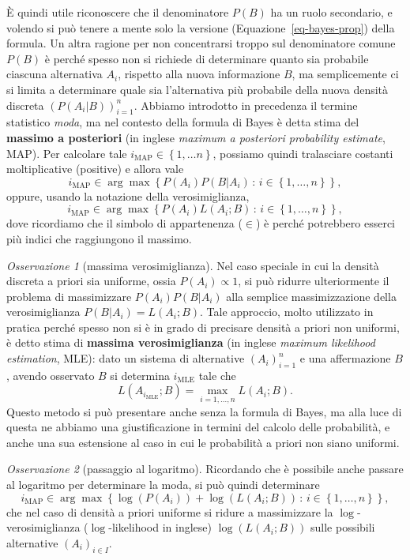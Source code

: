 \documentclass[
  italian,
  letterpaper,
]{book}
\newcommand{\cur}[1]{\left\{ #1 \right\}}
\newcommand{\map}{\operatorname{MAP}}
\newcommand{\mle}{\operatorname{MLE}}
\theoremstyle{definition}
\theoremstyle{remark}
\newtheorem*{remark}{Osservazione}
\begin{document}
È quindi utile riconoscere che il denominatore \(P(B)\) ha un ruolo
secondario, e volendo si può tenere a mente solo la versione
(Equazione~\ref{eq-bayes-prop}) della formula. Un altra ragione per non
concentrarsi troppo sul denominatore comune \(P(B)\) è perché spesso non
si richiede di determinare quanto sia probabile ciascuna alternativa
\(A_i\), rispetto alla nuova informazione \(B\), ma semplicemente ci si
limita a determinare quale sia l'alternativa più probabile della nuova
densità discreta \((P(A_i|B))_{i=1}^n\). Abbiamo introdotto in
precedenza il termine statistico \emph{moda}, ma nel contesto della
formula di Bayes è detta stima del \textbf{massimo a posteriori} (in
inglese \emph{maximum a posteriori probability estimate}, MAP). Per
calcolare tale \(i_{\map} \in \cur{1, \ldots n}\), possiamo quindi
tralasciare costanti moltiplicative (positive) e allora vale
\[ i_{\map} \in \operatorname{arg} \max\cur{ P(A_i)  P(B | A_i )\, : \, i \in \cur{1, \ldots, n} }, \]
oppure, usando la notazione della verosimiglianza,
\[ i_{\map} \in \operatorname{arg} \max\cur{ P(A_i)  L( A_i ;B )\, : \, i \in \cur{1, \ldots, n} }, \]
dove ricordiamo che il simbolo di appartenenza (\(\in\)) è perché
potrebbero esserci più indici che raggiungono il massimo.

\begin{remark}[massima verosimiglianza]
Nel caso speciale in cui la densità discreta a priori sia uniforme,
ossia \(P(A_i) \propto 1\), si può ridurre ulteriormente il problema di
massimizzare \(P(A_i) P(B | A_i )\) alla semplice massimizzazione della
verosimiglianza \(P(B| A_i)=L(A_i;B)\). Tale approccio, molto utilizzato
in pratica perché spesso non si è in grado di precisare densità a priori
non uniformi, è detto stima di \textbf{massima verosimiglianza} (in
inglese \emph{maximum likelihood estimation}, MLE): dato un sistema di
alternative \((A_i)_{i=1}^n\) e una affermazione \(B\), avendo osservato
\(B\) si determina \(i_{\mle}\) tale che
\[ L(A_{i_{\mle}}; B)  = \max_{i=1, \ldots, n}L(A_i; B).\] Questo metodo
si può presentare anche senza la formula di Bayes, ma alla luce di
questa ne abbiamo una giustificazione in termini del calcolo delle
probabilità, e anche una sua estensione al caso in cui le probabilità a
priori non siano uniformi.
\end{remark}

\begin{remark}[passaggio al logaritmo]
Ricordando che è possibile anche passare al logaritmo per determinare la
moda, si può quindi determinare
\[  i_{\map} \in \operatorname{arg} \max\cur{ \log( P(A_i)) + \log( L( A_i ;B ))\, : \, i \in \cur{1, \ldots, n} }, \]
che nel caso di densità a priori uniforme si ridure a massimizzare la
\(\log\)-verosimiglianza (\(\log\)-likelihood in inglese)
\(\log( L(A_i; B))\) sulle possibili alternative \((A_i)_{i\in I}\).
\end{remark}
\end{document}
